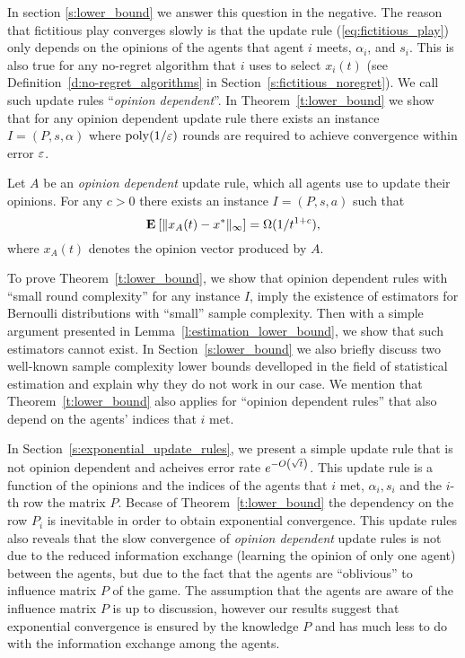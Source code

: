 In section \ref{s:lower_bound} we answer this question in the negative.
The reason that fictitious play converges slowly is that 
the update rule (\ref{eq:fictitious_play})
only depends on the opinions of the agents that agent $i$ meets,
$\alpha_i$, and $s_i$. This is also true for any no-regret algorithm 
that $i$ uses to select $x_i(t)$ (see Definition~\ref{d:no-regret_algorithms} in Section~\ref{s:fictitious_noregret}). 
We call such update rules \enquote{\emph{opinion dependent}}.
In Theorem~\ref{t:lower_bound} we
show that for any opinion dependent update rule there exists an instance
$I = (P,s,\alpha)$ where $\mathrm{poly}(1/\varepsilon)$ rounds are required to
achieve convergence within error $\varepsilon$.
\begin{theorem}\label{t:lower_bound}
  Let $A$ be an \emph{opinion dependent} update rule, which all
  agents use to update their opinions.
  For any $c>0$ there exists an instance $I=(P,s,a)$ such that
  \[
    \Exp{\norm{\infty}{x_A(t) - x^*}} = \Omega(1/t^{1+c}),
  \]
where $x_A(t)$ denotes the opinion vector produced by $A$.
\end{theorem}
\noindent To prove Theorem~\ref{t:lower_bound}, we show that opinion dependent rules with
\enquote{small round complexity} for any instance $I$, imply the existence of estimators for Bernoulli distributions with 
\enquote{small} sample complexity. Then with a simple argument 
presented in Lemma~\ref{l:estimation_lower_bound},
we show that such estimators cannot exist.
In Section~\ref{s:lower_bound} we also
briefly discuss two well-known sample complexity lower bounds develloped in the field of
statistical estimation and explain why they do not work in our case. 
We mention that Theorem~\ref{t:lower_bound} also applies for \enquote{opinion dependent rules} that
also depend on the agents' indices that $i$ met.

In Section~\ref{s:exponential_update_rules}, we present 
a simple update rule that is not opinion dependent and  acheives 
error rate $e^{-O\left(\sqrt{t}\right)}$. This update rule is a function of
the opinions and the indices of the agents that $i$ met, $\alpha_i,s_i$ 
and the $i$-th row the matrix $P$. Becase of Theorem~\ref{t:lower_bound} 
the dependency on the row $P_i$ is inevitable in order to obtain exponential convergence.  
This update rules also reveals that the slow convergence of \emph{opinion dependent} update
rules is not due to the reduced information exchange (learning the opinion of only one agent)
between the agents, but due to the fact that the agents are \enquote{oblivious} to influence matrix $P$ of 
the game. The assumption that the agents are aware of the influence matrix $P$ is up to discussion,
however our results suggest that exponential convergence is ensured by the knowledge $P$ and has much less
to do with the information exchange among the agents.


